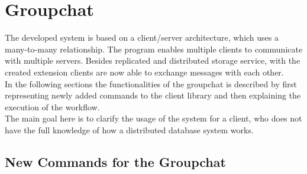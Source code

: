 \section{Groupchat}
\label{sec:groupchat}

The developed system is based on a client/server architecture, which uses a many-to-many relationship. The program enables multiple clients to communicate with multiple servers. Besides replicated and distributed storage service, with the created extension clients are now able to exchange messages with each other.\\ In the following sections the functionalities of the groupchat is described by first representing newly added commands to the client library and then explaining the execution of the workflow. \\
The main goal here is to clarify the usage of the system for a client, who does not have the full knowledge of how a distributed database system works.

\subsection{New Commands for the Groupchat}
\label{sec:groupchat_commands}


